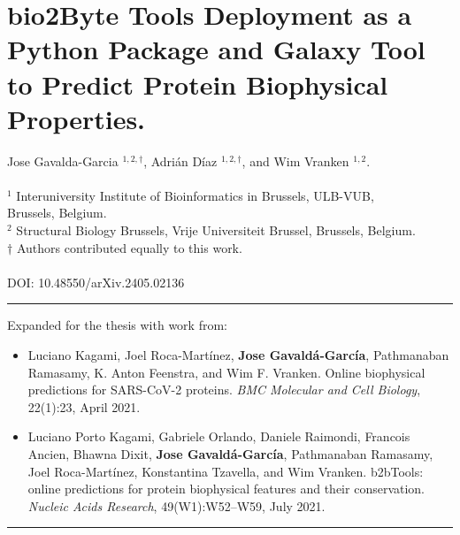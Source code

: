 \chapter[\texorpdfstring{bio2Byte Tools Deployment as a Python Package and Galaxy Tool to Predict Protein Biophysical Properties}{bio2Byte Tools Deployment as a Python Package and Galaxy Tool to Predict Protein Biophysical Properties}]{bio2Byte Tools Deployment as a Python Package and Galaxy Tool to Predict Protein Biophysical Properties.}\label{chapter:b2btools_deployment}

Jose Gavalda-Garcia $^{1,2,\dag}$, Adrián Díaz $^{1,2,\dag}$, and Wim Vranken $^{1,2}$.
\\
\\
$^{1}$ Interuniversity Institute of Bioinformatics in Brussels, ULB-VUB, \\Brussels, Belgium.
\\
$^{2}$ Structural Biology Brussels, Vrije Universiteit Brussel, Brussels, Belgium.
\\
$\dag$ Authors contributed equally to this work.
\\
\\
DOI: 10.48550/arXiv.2405.02136
\vspace{1em}
\hrule
\vspace{1em}
\noindent Expanded for the thesis with work from: 
\begin{itemize}

\item Luciano Kagami, Joel Roca-Martínez, \textbf{Jose Gavaldá-García}, Pathmanaban Ramasamy, K. Anton Feenstra, and Wim F. Vranken. Online biophysical predictions for SARS-CoV-2 proteins. \textit{BMC Molecular and Cell Biology}, 22(1):23, April 2021.

\item Luciano Porto Kagami, Gabriele Orlando, Daniele Raimondi, Francois Ancien, Bhawna Dixit, \textbf{Jose Gavaldá-García}, Pathmanaban Ramasamy, Joel Roca-Martínez, Konstantina Tzavella, and Wim Vranken. b2bTools: online predictions for protein biophysical features and their conservation. \textit{Nucleic Acids Research}, 49(W1):W52–W59, July 2021.

\end{itemize}
\vspace{1em}
\hrule
\vspace{1em}
